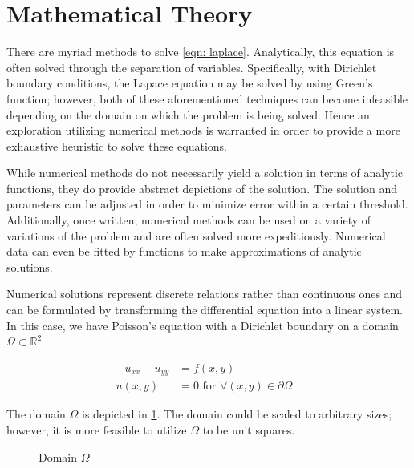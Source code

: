 \documentclass[10pt,a4paper]{article}
\begin{document}
\section*{Mathematical Theory}
There are myriad methods to solve \cref{eqn: laplace}. Analytically, this equation is often solved through the separation of variables. Specifically, with Dirichlet boundary conditions, the Lapace equation may be solved by using Green's function; however, both of these aforementioned techniques can become infeasible depending on the domain on which the problem is being solved. Hence an exploration utilizing numerical methods is warranted in order to provide a more exhaustive heuristic to solve these equations.

While numerical methods do not necessarily yield a solution in terms of analytic functions, they do provide abstract depictions of the solution. The solution and parameters can be adjusted in order to minimize error within a certain threshold. Additionally, once written, numerical methods can be used on a variety of variations of the problem and are often solved more expeditiously. Numerical data can even be fitted by functions to make approximations of analytic solutions.

Numerical solutions represent discrete relations rather than continuous ones and can be formulated by transforming the differential equation into a linear system. In this case, we have Poisson's equation with a Dirichlet boundary on a domain $\Omega \subset \mathbb{R}^2$

\begin{subequations}
  \begin{align}
  -u_{xx} - u_{yy} &= f(x, y) & \\
  u(x, y) &= 0 \,\, \text{for} \,\, \forall(x, y) \in \partial \Omega
  \end{align}
\end{subequations}

The domain $\Omega$ is depicted in \cref{fig: domain}. The domain could be scaled to arbitrary sizes; however, it is more feasible to utilize $\Omega$ to be unit squares.

\begin{figure}[H]
\center
{}
\caption{Domain $\Omega$}
\label{fig: domain}
\end{figure}
\end{document}
